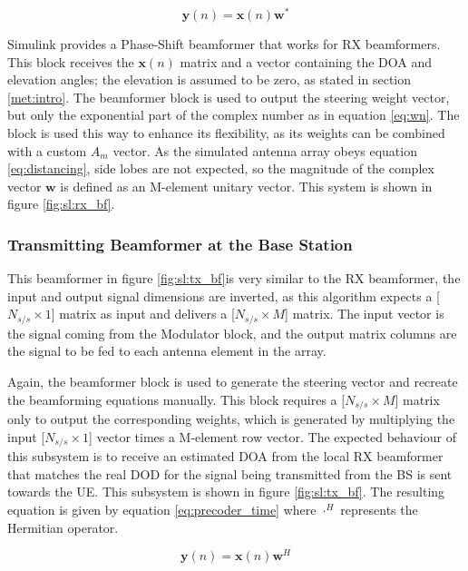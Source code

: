\documentclass[12pt,a4paper]{report}
\begin{document}
\begin{equation}
    \textbf{y}(n) = \textbf{x}(n) \textbf{w}^*
    \label{eq:combiner_time3}
\end{equation}

Simulink provides a Phase-Shift beamformer that works for RX beamformers. This block receives the $\textbf{x}(n)$ matrix and a vector containing the DOA and elevation angles; the elevation is assumed to be zero, as stated in section \ref{met:intro}. The beamformer block is used to output the steering weight vector, but only the exponential part of the complex number as in equation \ref{eq:wn}. The block is used this way to enhance its flexibility, as its weights can be combined with a custom $A_m$ vector. As the simulated antenna array obeys equation \ref{eq:distancing}, side lobes are not expected, so the magnitude of the complex vector $\textbf{w}$ is defined as an M-element unitary vector. This system is shown in figure \ref{fig:sl:rx_bf}.

\subsubsection{Transmitting Beamformer at the Base Station} \label{met:sim:bf:tx}
This beamformer in figure \ref{fig:sl:tx_bf}is very similar to the RX beamformer, the input and output signal dimensions are inverted, as this algorithm expects a [$N_{s/s} \times 1$] matrix as input and delivers a [$N_{s/s} \times M$] matrix. The input vector is the signal coming from the Modulator block, and the output matrix columns are the signal to be fed to each antenna element in the array. 

Again, the beamformer block is used to generate the steering vector and recreate the beamforming equations manually. This block requires a [$N_{s/s} \times  M$] matrix only to output the corresponding weights, which is generated by multiplying the input [$N_{s/s} \times 1$] vector times a M-element row vector. The expected behaviour of this subsystem is to receive an estimated DOA from the local RX beamformer that matches the real DOD for the signal being transmitted from the BS is sent towards the UE. This subsystem is shown in figure \ref{fig:sl:tx_bf}. The resulting equation is given by equation \ref{eq:precoder_time} where $\cdot^H$ represents the Hermitian operator.

\begin{equation}
    \textbf{y}(n) = \textbf{x}(n) \textbf{w}^H
    \label{eq:precoder_time}
\end{equation}
\end{document}

